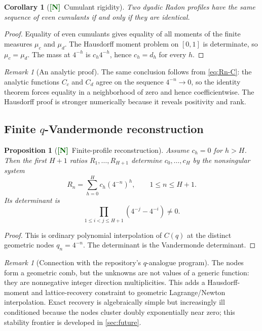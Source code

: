 \documentclass[11pt]{article}
\numberwithin{equation}{section}
\newtheorem{proposition}[theorem]{Proposition}
\newtheorem{corollary}[theorem]{Corollary}
\theoremstyle{definition}
\theoremstyle{remark}
\newtheorem{remark}[theorem]{Remark}
\newcommand{\New}{\textcolor{darkgreen}{\textsf{\textbf{[N]}}}}
\begin{document}
\begin{corollary}[\New\ Cumulant rigidity]
\label{cor:cumulant-rigidity}
Two dyadic Radon profiles have the same sequence of even cumulants if and only
if they are identical.
\end{corollary}

\begin{proof}
Equality of even cumulants gives equality of all moments of the finite measures
$\mu_c$ and $\mu_d$.  The Hausdorff moment problem on $[0,1]$ is determinate,
so $\mu_c=\mu_d$.  The mass at $4^{-h}$ is $c_h4^{-h}$, hence $c_h=d_h$ for
every $h$.
\end{proof}

\begin{remark}[An analytic proof]
The same conclusion follows from \eqref{eq:Rn-C}: the analytic functions
$C_c$ and $C_d$ agree on the sequence $4^{-n}\to0$, so the identity theorem
forces equality in a neighborhood of zero and hence coefficientwise.
The Hausdorff proof is stronger numerically because it reveals positivity and
rank.
\end{remark}

\subsection{Finite $q$-Vandermonde reconstruction}

\begin{proposition}[\New\ Finite-profile reconstruction]
\label{prop:finite-reconstruction}
Assume $c_h=0$ for $h>H$.  Then the first $H+1$ ratios
$R_1,\ldots,R_{H+1}$ determine $c_0,\ldots,c_H$ by the nonsingular system
\begin{equation}
 R_n=\sum_{h=0}^{H}c_h(4^{-n})^h,
 \qquad 1\le n\le H+1.
 \label{eq:Vandermonde-system}
\end{equation}
Its determinant is
\begin{equation}
 \prod_{1\le i<j\le H+1}(4^{-j}-4^{-i})\ne0.
 \label{eq:q-Vandermonde}
\end{equation}
\end{proposition}

\begin{proof}
This is ordinary polynomial interpolation of $C(q)$ at the distinct geometric
nodes $q_n=4^{-n}$.  The determinant is the Vandermonde determinant.
\end{proof}

\begin{remark}[Connection with the repository's $q$-analogue program]
The nodes form a geometric comb, but the unknowns are not values of a generic
function: they are nonnegative integer direction multiplicities.  This adds a
Hausdorff-moment and lattice-recovery constraint to geometric Lagrange/Newton
interpolation.  Exact recovery is algebraically simple but increasingly ill
conditioned because the nodes cluster doubly exponentially near zero; this
stability frontier is developed in \cref{sec:future}.
\end{remark}
\end{document}
